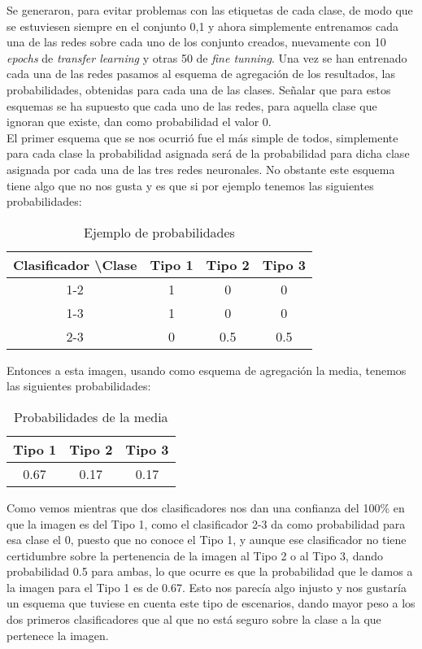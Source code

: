 Se generaron, para evitar problemas con las etiquetas de cada clase, de modo que se estuviesen siempre en el conjunto {0,1} y ahora simplemente entrenamos cada una de las redes sobre cada uno de los conjunto creados, nuevamente con 10 \textit{epochs} de \textit{transfer learning} y otras 50 de \textit{fine tunning}. Una vez se han entrenado cada una de las redes pasamos al esquema de agregación de los resultados, las probabilidades, obtenidas para cada una de las clases. Señalar que para estos esquemas se ha supuesto que cada uno de las redes, para aquella clase que ignoran que existe, dan como probabilidad el valor 0.\\

El primer esquema que se nos ocurrió fue el más simple de todos, simplemente para cada clase la probabilidad asignada será  de la probabilidad para dicha clase asignada por cada una de las tres redes neuronales. No obstante este esquema tiene algo que no nos gusta y es que si por ejemplo tenemos las siguientes probabilidades:

\begin{table}[H]
\centering
\caption{Ejemplo de probabilidades}
\label{my-label}
\begin{tabular}{|c|c|c|c|}
\hline
Clasificador \textbackslash Clase & Tipo 1 & Tipo 2 & Tipo 3 \\ \hline
1-2                               & 1      & 0      & 0      \\ \hline
1-3                               & 1      & 0      & 0      \\ \hline
2-3                               & 0      & 0.5    & 0.5    \\ \hline
\end{tabular}
\end{table}

Entonces a esta imagen, usando como esquema de agregación la media, tenemos las siguientes probabilidades:

\begin{table}[H]
\centering
\caption{Probabilidades de la media}
\begin{tabular}{|c|c|c|}
\hline
Tipo 1 & Tipo 2 & Tipo 3 \\ \hline
0.67   & 0.17   & 0.17   \\ \hline
\end{tabular}
\end{table}

Como vemos mientras que dos clasificadores nos dan una confianza del 100\% en que la imagen es del Tipo 1, como el clasificador 2-3 da como probabilidad para esa clase el 0, puesto que no conoce el Tipo 1, y aunque ese clasificador no tiene certidumbre sobre la pertenencia de la imagen al Tipo 2 o al Tipo 3, dando probabilidad 0.5 para ambas, lo que ocurre es que la probabilidad que le damos a la imagen para el Tipo 1 es de 0.67. Esto nos parecía algo injusto y nos gustaría un esquema que tuviese en cuenta este tipo de escenarios, dando mayor peso a los dos primeros clasificadores que al que no está seguro sobre la clase a la que pertenece la imagen.\\

